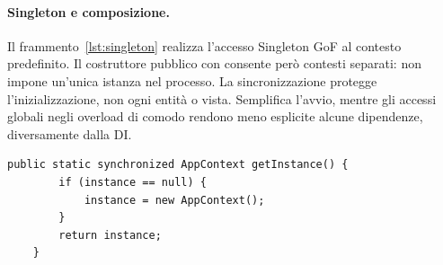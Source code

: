 \paragraph{Singleton e composizione.}
Il frammento~\ref{lst:singleton} realizza l'accesso Singleton GoF al contesto
predefinito. Il costruttore pubblico con  consente
però contesti separati: non impone un'unica istanza nel processo.
La sincronizzazione protegge l'inizializzazione, non ogni entità o vista.
Semplifica l'avvio, mentre gli accessi globali negli overload di comodo
rendono meno esplicite alcune dipendenze, diversamente dalla DI.

\noindent\begin{minipage}{\linewidth}
\begin{lstlisting}[firstnumber=112,caption={\code{AppContext.java}: accesso Singleton sincronizzato al contesto predefinito.},
  label=lst:singleton]
    public static synchronized AppContext getInstance() {
        if (instance == null) {
            instance = new AppContext();
        }
        return instance;
    }
\end{lstlisting}
\end{minipage}


\endgroup
